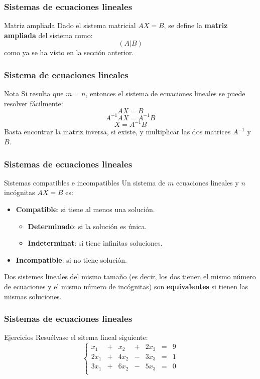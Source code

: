 \documentclass[12pt]{article}
\begin{document}
  
             \begin{frame}
    \frametitle{Sistemas de ecuaciones lineales}
       \begin{block}{Matriz ampliada}
Dado el sistema matricial $AX=B$, se define la \textbf{matriz ampliada} del sistema como: 
\[(A|B)\]
como ya se ha visto en la secci\'on anterior.
\end{block}
  \end{frame} 
  
    
             \begin{frame}
    \frametitle{Sistema de ecuaciones lineales}
       \begin{block}{Nota}
Si resulta que $m=n$, entonces el sistema de ecuaciones lineales se puede resolver f\'acilmente:
\[AX=B\]
\[A^{-1}AX=A^{-1}B\]
\[X=A^{-1}B\]
Basta encontrar la matriz inversa, si existe, y multiplicar las dos matrices $A^{-1}$ y $B$.
\end{block}
  \end{frame} 
  
  
               \begin{frame}
    \frametitle{Sistemas de ecuaciones lineales}
       \begin{block}{Sistemas compatibles e incompatibles}
Un sistema de $m$ ecuaciones lineales y $n$ inc\'ognitas $AX=B$ es:
\begin{itemize}
\item \textbf{Compatible}: si tiene al menos una soluci\'on.
\begin{itemize}
\item \textbf{Determinado}: si la soluci\'on es \'unica.
\item \textbf{Indeterminat}: si tiene infinitas soluciones.
\end{itemize}\item \textbf{Incompatible}: si no tiene soluci\'on.
\end{itemize}
\end{block}
Dos sistemes lineales del mismo tama\~no (es decir, los dos tienen el mismo n\'umero de ecuaciones y el mismo n\'umero de inc\'ognitas) son \textbf{equivalentes} si tienen las mismas soluciones.

  \end{frame} 
  
  
  
    
               \begin{frame}
    \frametitle{Sistemas de ecuaciones lineales}
       \begin{block}{Ejercicios}
Resu\'elvase el sitema lineal siguiente:
\[\left\{\begin{array}{ccccccc}
x_1 & + & x_2 & + & 2x_3 & = & 9\\
2x_1 & + & 4x_2 & - & 3x_3 & = & 1\\
3x_1 & + & 6x_2 & - &  5x_3 & = & 0\\
\end{array}\right.\]
\end{block}
  \end{frame} 
\end{document}
